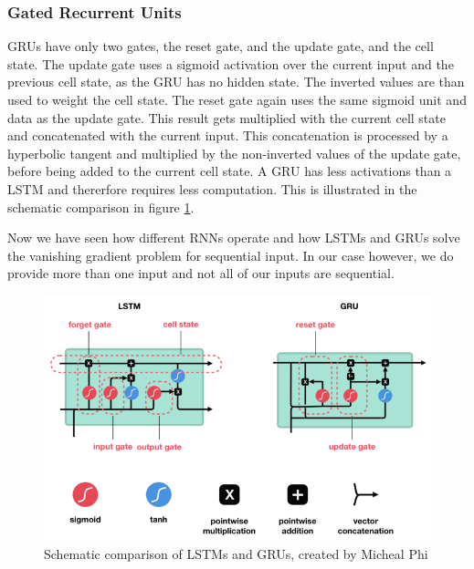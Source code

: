 \documentclass[
	ngerman,
	ruledheaders=section,%
	class=report,%
	thesis={type=bachelor},%
	accentcolor=9c,%
	custommargins=true,%
	marginpar=false,%
	parskip=half-,%
	fontsize=11pt,%
]{tudapub}
\begin{document}
\subsubsection{Gated Recurrent Units}

GRUs have only two gates, the reset gate, and the update gate, and the cell state. \cite{phiIllustratedGuideLSTM2020}
The update gate uses a sigmoid activation over the current input and the previous cell state, as the GRU has no hidden state.
The inverted values are than used to weight the cell state.
The reset gate again uses the same sigmoid unit and data as the update gate.
This result gets multiplied with the current cell state and concatenated with the current input.
This concatenation is processed by a hyperbolic tangent and multiplied by the non-inverted values of the update gate, before being added to the current cell state.
A GRU has less activations than a LSTM and thererfore requires less computation.
This is illustrated in the schematic comparison in figure \ref{fig:LSTMvGRU}.

Now we have seen how different RNNs operate and how LSTMs and GRUs solve the vanishing gradient problem for sequential input.
In our case however, we do provide more than one input and not all of our inputs are sequential.

\begin{figure}
    \includegraphics[width=\textwidth]{LSTMvGRU.png}
    \caption{Schematic comparison of LSTMs and GRUs, created by Micheal Phi \cite{phiIllustratedGuideLSTM2020}}
    \label{fig:LSTMvGRU}
\end{figure}
\end{document}
